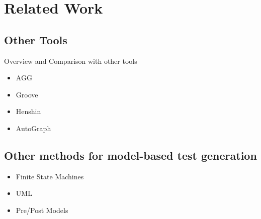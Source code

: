\chapter{Related Work}\label{ch:related-work}

\section{Other Tools}

Overview and Comparison with other tools

\begin{itemize}
\item AGG
\item Groove
\item Henshin
\item AutoGraph
\end{itemize}

\section{Other methods for model-based test generation}

\begin{itemize}
  \item Finite State Machines
  \item UML
  \item Pre/Post Models
\end{itemize}

